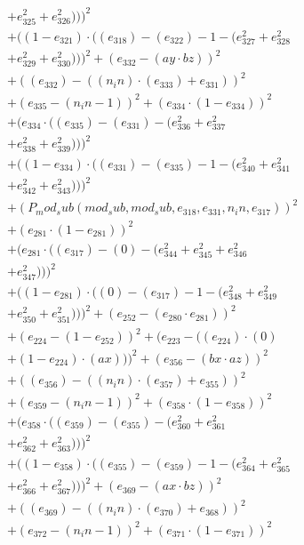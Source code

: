 \documentclass[10pt, a4paper]{article}
\begin{document}
\begin{small}
\begin{align*}
& + e_{325}^{2} + e_{326}^{2})))^{2} \\
& + ((1 - e_{321})  \cdot  ((e_{318}) - (e_{322}) - 1 - (e_{327}^{2} + e_{328}^{2} \\
& + e_{329}^{2} + e_{330}^{2})))^{2} + (e_{332} - (ay  \cdot  bz))^{2} \\
& + ((e_{332}) - ((n_in)  \cdot  (e_{333}) + e_{331}))^{2} \\
& + (e_{335} - (n_in - 1))^{2} + (e_{334}  \cdot  (1 - e_{334}))^{2} \\
& + (e_{334}  \cdot  ((e_{335}) - (e_{331}) - (e_{336}^{2} + e_{337}^{2} \\
& + e_{338}^{2} + e_{339}^{2})))^{2} \\
& + ((1 - e_{334})  \cdot  ((e_{331}) - (e_{335}) - 1 - (e_{340}^{2} + e_{341}^{2} \\
& + e_{342}^{2} + e_{343}^{2})))^{2} \\
& + (P_mod_sub(mod_sub, mod_sub, e_{318}, e_{331}, n_in, e_{317}))^{2} \\
& + (e_{281}  \cdot  (1 - e_{281}))^{2} \\
& + (e_{281}  \cdot  ((e_{317}) - (0) - (e_{344}^{2} + e_{345}^{2} + e_{346}^{2} \\
& + e_{347}^{2})))^{2} \\
& + ((1 - e_{281})  \cdot  ((0) - (e_{317}) - 1 - (e_{348}^{2} + e_{349}^{2} \\
& + e_{350}^{2} + e_{351}^{2})))^{2} + (e_{252} - (e_{280}  \cdot  e_{281}))^{2} \\
& + (e_{224} - (1 - e_{252}))^{2} + (e_{223} - ((e_{224})  \cdot  (0) \\
& + (1 - e_{224})  \cdot  (ax)))^{2} + (e_{356} - (bx  \cdot  az))^{2} \\
& + ((e_{356}) - ((n_in)  \cdot  (e_{357}) + e_{355}))^{2} \\
& + (e_{359} - (n_in - 1))^{2} + (e_{358}  \cdot  (1 - e_{358}))^{2} \\
& + (e_{358}  \cdot  ((e_{359}) - (e_{355}) - (e_{360}^{2} + e_{361}^{2} \\
& + e_{362}^{2} + e_{363}^{2})))^{2} \\
& + ((1 - e_{358})  \cdot  ((e_{355}) - (e_{359}) - 1 - (e_{364}^{2} + e_{365}^{2} \\
& + e_{366}^{2} + e_{367}^{2})))^{2} + (e_{369} - (ax  \cdot  bz))^{2} \\
& + ((e_{369}) - ((n_in)  \cdot  (e_{370}) + e_{368}))^{2} \\
& + (e_{372} - (n_in - 1))^{2} + (e_{371}  \cdot  (1 - e_{371}))^{2} \\

\end{align*}
\end{small}
\end{document}
